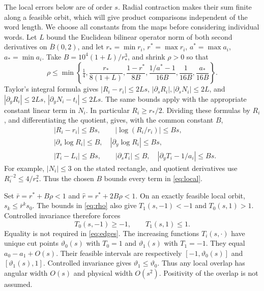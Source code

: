 \documentclass[11pt]{amsart}
\theoremstyle{definition}
\theoremstyle{remark}
\numberwithin{equation}{section}
\begin{document}
The local errors below are of order $s$. Radial contraction makes
their sum finite along a feasible orbit, which will give product
comparisons independent of the word length. We choose all constants
from the maps before considering individual words. Let
\(L\) bound the Euclidean bilinear operator norm of both second
derivatives on \(\overline B(0,2)\), and let
\(r_*=\min r_i\), \(r^*=\max r_i\), \(a^*=\max a_i\),
\(a_*=\min a_i\). Take
\(B=10^4(1+L)/r_*^3\), and shrink \(\rho>0\) so that
\begin{equation}
\rho\le\min\left\{\tfrac14,\frac{r_*}{8(1+L)},
  \frac{1-r^*}{8B},\frac{1/a^*-1}{16B},
  \frac1{16B},\frac{a_*}{16B}\right\}.                        \label{eq:rho}
\end{equation}
Taylor's integral formula gives \(|R_i-r_i|\le2Ls\),
\(|\partial_sR_i|,|\partial_sN_i|\le2L\), and
\(|\partial_yR_i|\le2Ls\),
\(|\partial_yN_i-t_i|\le2Ls\).
The same bounds apply with the appropriate constant linear term in
\(N_i\). In particular \(R_i\ge r_*/2\).
Dividing these formulas by \(R_i\), and differentiating the quotient,
gives, with the common constant \(B\),
\begin{equation}
\begin{split}
 &|R_i-r_i|\le Bs,\qquad |\log(R_i/r_i)|\le Bs,\\
 &|\partial_s\log R_i|\le B,
          \quad |\partial_y\log R_i|\le Bs,\\
 &|T_i-L_i|\le Bs,\qquad |\partial_sT_i|\le B,
          \quad |\partial_yT_i-1/a_i|\le Bs .                 \label{eq:local}
\end{split}
\end{equation}
For example, \(|N_i|\le3\) on the stated rectangle, and
quotient derivatives use \(R_i^{-2}\le4/r_*^2\). Thus the chosen
\(B\) bounds every term in \eqref{eq:local}.

Set \(\bar r=r^*+B\rho<1\) and
\(\widehat r=r^*+2B\rho<1\). On an exactly feasible local orbit,
\(s_k\le\bar r^ks_0\). The bounds in \eqref{eq:rho} also give
\(T_1(s,-1)<-1\) and \(T_0(s,1)>1\). Controlled invariance therefore
forces
\begin{equation}
T_0(s,-1)\ge-1,\qquad T_1(s,1)\le1.       \label{eq:edges}
\end{equation}
Equality is not required in \eqref{eq:edges}.
The increasing functions \(T_i(s,\cdot)\) have unique cut points
\(\vartheta_0(s)\) with \(T_0=1\) and \(\vartheta_1(s)\) with
\(T_1=-1\). They equal \(a_0-a_1+O(s)\).
Their feasible intervals are respectively
\([-1,\vartheta_0(s)]\) and \([\vartheta_1(s),1]\).
Controlled invariance gives \(\vartheta_1\le\vartheta_0\).
Thus any local overlap has angular width \(O(s)\) and physical
width \(O(s^2)\). Positivity of the overlap is not assumed.
\end{document}
